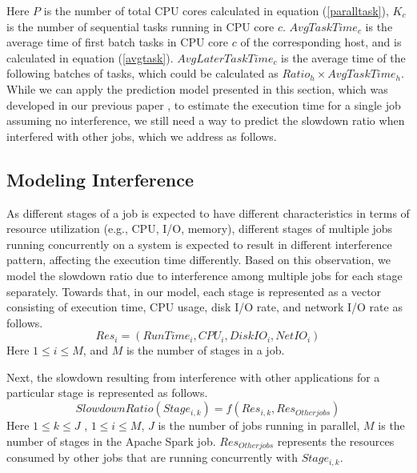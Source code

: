Here $P$ is the number of total CPU cores calculated in equation (\ref{paralltask}), $K_c$ is the number of sequential tasks running in CPU core $c$. $AvgTaskTime_c$ is the average time of first batch tasks in CPU core $c$ of the corresponding host, and is calculated in equation (\ref{avgtask}). $AvgLaterTaskTime_c$ is the average time of the following batches of tasks, which could be calculated as $Ratio_h \times AvgTaskTime_h$.
\noindent
While we can apply the prediction model presented in this section, which was developed in our previous paper \cite{wangperformance}, to estimate the execution time for a single job assuming no interference, we still need a way to predict the slowdown ratio when interfered with other jobs, which we address as follows.
\subsection{Modeling Interference}
As different stages of a job is expected to have different characteristics in terms of resource utilization (e.g., CPU, I/O, memory), different stages of multiple jobs running concurrently on a system is expected to result in different interference pattern, affecting the execution time differently. Based on this observation, we model the slowdown ratio due to interference among multiple jobs for each stage separately. Towards that, in our model, each stage is represented as a vector consisting of execution time, CPU usage, disk I/O rate, and network I/O rate as follows.
\begin{equation}
\label{res}
Res_i = (RunTime_i, CPU_i, DiskIO_i, NetIO_i)
\end{equation}
Here $1 \leq i \leq M$, and $M$ is the number of stages in a job.
\par \noindent 
Next, the slowdown resulting from interference with other applications for a particular stage is represented as follows.
\begin{equation}
\label{slowdownratio}
SlowdownRatio(Stage_{i,k})
= f(Res_{i,k},Res_{Other jobs})
\end{equation}
\noindent
Here $1 \leq k \leq J$ , $1 \leq i \leq M$, $J$ is the number of jobs running in parallel, $M$ is the number of stages in the Apache Spark job. $Res_{Otherjobs}$ represents the resources consumed by other jobs that are running concurrently with $Stage_{i,k}$. 
